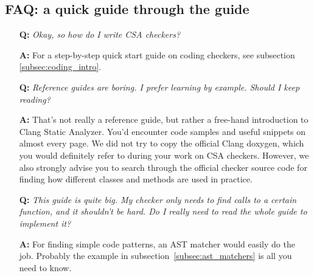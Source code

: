 \documentclass[a4paper,12pt]{article}
\newenvironment{nobr}{\begin{minipage}{\textwidth}\setlength\parskip{1em}
}{\end{minipage}\ignorespacesafterend}
\begin{document}
\newpage
\subsection{FAQ: a quick guide through the guide}

\begin{nobr}
\begin{itemize}
\item[\textbf{Q:}] \emph{Okay, so how do I write CSA checkers?}
\item[\textbf{A:}] For a step-by-step quick start guide on coding checkers, see subsection \ref{subsec:coding_intro}.
\end{itemize}
\medskip
\end{nobr}

\begin{nobr}
\begin{itemize}
\item[\textbf{Q:}] \emph{Reference guides are boring. I prefer learning by example. Should I keep reading?}
\item[\textbf{A:}] That's not really a reference guide, but rather a free-hand introduction to Clang Static Analyzer. You'd encounter code samples and useful snippets on almost every page. We did not try to copy the official Clang doxygen, which you would definitely refer to during your work on CSA checkers. However, we also strongly advise you to search through the official checker source code for finding how different classes and methods are used in practice.
\end{itemize}
\medskip
\end{nobr}

\begin{nobr}
\begin{itemize}
\item[\textbf{Q:}] \emph{This guide is quite big. My checker only needs to find calls to a certain function, and it shouldn't be hard. Do I really need to read the whole guide to implement it?}
\item[\textbf{A:}] For finding simple code patterns, an AST matcher would easily do the job. Probably the example in subsection~\ref{subsec:ast_matchers} is all you need to know.
\end{itemize}
\medskip
\end{nobr}
\end{document}
